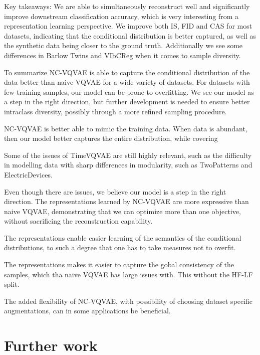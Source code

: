 \documentclass[../../thesis.tex]{subfiles}
\begin{document}
Key takeaways: We are able to simultaneously reconstruct well and significantly improve downstream classification accuracy, which is very interesting from a representation learning perspective. We improve both IS, FID and CAS for most datasets, indicating that the conditional distribution is better captured, as well as the synthetic data being closer to the ground truth. Additionally we see some differences in Barlow Twins and VIbCReg when it comes to sample diversity.\newline

To summarize NC-VQVAE is able to capture the conditional distribution of the data better than naive VQVAE for a wide variety of datasets. For datasets with few training samples, our model can be prone to overfitting. We see our model as a step in the right direction, but further development is needed to ensure better intraclass diversity, possibly through a more refined sampling procedure. \newline


NC-VQVAE is better able to mimic the training data. When data is abundant, then our model better captures the entire distribution, while covering \newline

Some of the issues of TimeVQVAE are still highly relevant, such as the difficulty in modelling data with sharp differences in modularity, such as TwoPatterns and ElectricDevices.\newline



Even though there are issues, we believe our model is a step in the right direction. The representations learned by NC-VQVAE are more expressive than naive VQVAE, demonstrating that we can optimize more than one objective, without sacrificing the reconstruction capability. 

The representations enable easier learning of the semantics of the conditional distributions, to such a degree that one has to take measures not to overfit. 

The representations makes it easier to capture the gobal consistency of the samples, which tha naive VQVAE has large issues with. This without the HF-LF split.

The added flexibility of NC-VQVAE, with possibility of choosing dataset specific augmentations, can in some applications be beneficial.\newline


\section{Further work}
\end{document}
